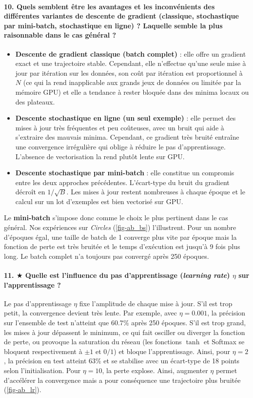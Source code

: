 \documentclass{report}
\begin{document}
\paragraph{10. Quels semblent être les avantages et les inconvénients des différentes variantes de descente de gradient (classique, stochastique par mini-batch, stochastique en ligne) ? Laquelle semble la plus raisonnable dans le cas général ?}
\begin{itemize}
	\item \textbf{Descente de gradient classique (batch complet)} : elle offre un gradient exact et une trajectoire stable. Cependant, elle n'effectue qu'une seule mise à jour par itération sur les données, son coût par itération est proportionnel à $N$ (ce qui la rend inapplicable aux grands jeux de données ou limitée par la mémoire GPU) et elle a tendance à rester bloquée dans des minima locaux ou des plateaux.
	\item \textbf{Descente stochastique en ligne (un seul exemple)} : elle permet des mises à jour très fréquentes et peu coûteuses, avec un bruit qui aide à s'extraire des mauvais minima. Cependant, ce gradient très bruité entraîne une convergence irrégulière qui oblige à réduire le pas d'apprentissage. L'absence de vectorisation la rend plutôt lente sur GPU.
	\item \textbf{Descente stochastique par mini-batch} : elle constitue un compromis entre les deux approches précédentes. L'écart-type du bruit du gradient décroît en $1/\sqrt{B}$. Les mises à jour restent nombreuses à chaque époque et le calcul sur un lot d'exemples est bien vectorisé sur GPU.
\end{itemize}
Le \textbf{mini-batch} s'impose donc comme le choix le plus pertinent dans le cas général. Nos expériences sur \textit{Circles} (\cref{fig-ab_bs}) l'illustrent. Pour un nombre d'époques égal, une taille de batch de 1 converge plus vite par époque mais la fonction de perte est très bruitée et le temps d'exécution est jusqu'à 9 fois plus long. Le batch complet n'a toujours pas convergé après 250 époques.

\paragraph{11. $\bigstar$ Quelle est l'influence du pas d'apprentissage (\textit{learning rate}) $\eta$ sur l'apprentissage ?}
Le pas d'apprentissage $\eta$ fixe l'amplitude de chaque mise à jour. S'il est trop petit, la convergence devient très lente. Par exemple, avec $\eta = 0.001$, la précision sur l'ensemble de test n'atteint que $60.7\%$ après 250 époques. S'il est trop grand, les mises à jour dépassent le minimum, ce qui fait osciller ou diverger la fonction de perte, ou provoque la saturation du réseau (les fonctions $\tanh$ et Softmax se bloquent respectivement à $\pm 1$ et $0/1$) et bloque l'apprentissage. Ainsi, pour $\eta = 2$, la précision en test atteint $63\%$ et se stabilise avec un écart-type de 18 points selon l'initialisation. Pour $\eta = 10$, la perte explose. Ainsi, augmenter $\eta$ permet d'accélérer la convergence mais a pour conséquence une trajectoire plus bruitée (\cref{fig-ab_lr}).
\end{document}
